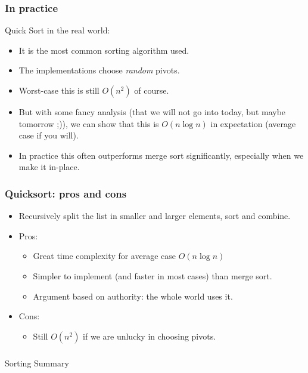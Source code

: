 \begin{frame}
	\frametitle{In practice}
	
Quick Sort in the real world:
			\begin{itemize}
				\item It is the most common sorting algorithm used.
				\item The implementations choose \textit{random} pivots.
					
				\item Worst-case this is still $O(n^2)$ of course.
					
				\item But with some fancy analysis (that we will not go into today, but maybe tomorrow ;)), we can show that
					this is $O(n \log n)$ in expectation (average case if you will).
					
				\item In practice this often outperforms merge sort significantly, especially when we make it in-place.
			\end{itemize}
\end{frame}

\begin{frame}
	\frametitle{Quicksort: pros and cons}
			\begin{itemize}
				\item Recursively split the list in smaller and larger elements, sort and combine.
				\item Pros:
			\begin{itemize}
				\item Great time complexity for average case $O(n\log n)$
				\item Simpler to implement (and faster in most cases) than merge sort.
				\item Argument based on authority: the whole world uses it.
			\end{itemize}
				\item Cons:
			\begin{itemize}
				\item Still $O(n^2)$ if we are unlucky in choosing pivots.
			\end{itemize}
		\end{itemize}	
\end{frame}

\begin{frame}[fragile]\frametitle{}
\begin{center}
{\Large Sorting Summary}
\end{center}

\end{frame}

